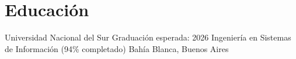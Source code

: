 \section{Educación}
\resumeSubHeadingListStart
  \resumeSubheading
    {Universidad Nacional del Sur}
    {Graduación esperada: 2026}
    {Ingeniería en Sistemas de Información (94\% completado)}
    {Bahía Blanca, Buenos Aires}
\resumeSubHeadingListEnd
